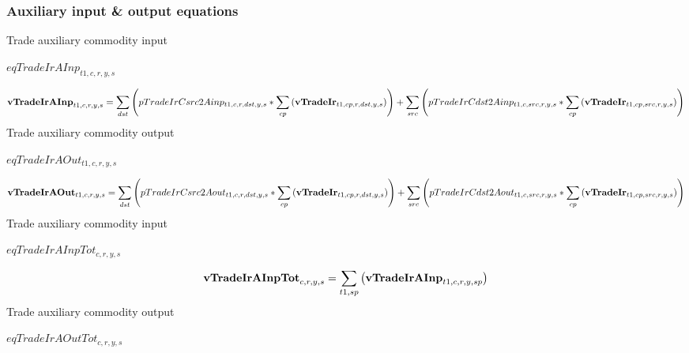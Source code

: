 \documentclass{article}
\begin{document}
\subsubsection*{Auxiliary input \& output equations}
Trade auxiliary commodity input







$eqTradeIrAInp_{t1,c,r,y,s}$





\begin{dmath} 
{\bf vTradeIrAInp}_{t1,c,r,y,s}  =  \sum_{dst}{\left(pTradeIrCsrc2Ainp_{t1,c,r,dst,y,s}*\sum_{cp}{\left({\bf vTradeIr}_{t1,cp,r,dst,y,s}\right)}\right)}+\sum_{src}{\left(pTradeIrCdst2Ainp_{t1,c,src,r,y,s}*\sum_{cp}{\left({\bf vTradeIr}_{t1,cp,src,r,y,s}\right)}\right)}
\end{dmath} 
Trade auxiliary commodity output







$eqTradeIrAOut_{t1,c,r,y,s}$





\begin{dmath} 
{\bf vTradeIrAOut}_{t1,c,r,y,s}  =  \sum_{dst}{\left(pTradeIrCsrc2Aout_{t1,c,r,dst,y,s}*\sum_{cp}{\left({\bf vTradeIr}_{t1,cp,r,dst,y,s}\right)}\right)}+\sum_{src}{\left(pTradeIrCdst2Aout_{t1,c,src,r,y,s}*\sum_{cp}{\left({\bf vTradeIr}_{t1,cp,src,r,y,s}\right)}\right)}
\end{dmath} 
Trade auxiliary commodity input







$eqTradeIrAInpTot_{c,r,y,s}$





\begin{dmath} 
{\bf vTradeIrAInpTot}_{c,r,y,s}  =  \sum_{t1,sp}{\left({\bf vTradeIrAInp}_{t1,c,r,y,sp}\right)}
\end{dmath} 
Trade auxiliary commodity output







$eqTradeIrAOutTot_{c,r,y,s}$
\end{document}
